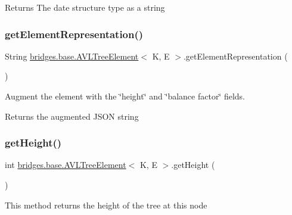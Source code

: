 \begin{DoxyReturn}{Returns}
The date structure type as a string 
\end{DoxyReturn}
\mbox{\label{classbridges_1_1base_1_1_a_v_l_tree_element_af7ab86f2421864daa4fdc2e84939f4ce}} 
\subsubsection{\texorpdfstring{get\+Element\+Representation()}{getElementRepresentation()}}
{\footnotesize\ttfamily String \hyperlink{classbridges_1_1base_1_1_a_v_l_tree_element}{bridges.\+base.\+A\+V\+L\+Tree\+Element}$<$ K, E $>$.get\+Element\+Representation (\begin{DoxyParamCaption}{ }\end{DoxyParamCaption})}

Augment the element with the \char`\"{}height\char`\"{} and \char`\"{}balance factor\char`\"{} fields.

\begin{DoxyReturn}{Returns}
the augmented J\+S\+ON string 
\end{DoxyReturn}
\mbox{\label{classbridges_1_1base_1_1_a_v_l_tree_element_a52fe2886334c841547d238db69022697}} 
\subsubsection{\texorpdfstring{get\+Height()}{getHeight()}}
{\footnotesize\ttfamily int \hyperlink{classbridges_1_1base_1_1_a_v_l_tree_element}{bridges.\+base.\+A\+V\+L\+Tree\+Element}$<$ K, E $>$.get\+Height (\begin{DoxyParamCaption}{ }\end{DoxyParamCaption})}

This method returns the height of the tree at this node


